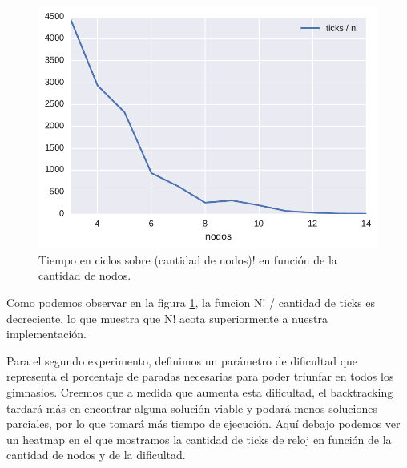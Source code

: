 \begin{figure}[H]
  \begin{center}
    \includegraphics{../experimentacion/ej1/ej1_complejidad.pdf}
    \caption{Tiempo en ciclos sobre (cantidad de nodos)! en función de la cantidad de nodos.}
    \label{fig:ej1_complejidad}
  \end{center}
\end{figure}

Como podemos observar en la figura \ref{fig:ej1_complejidad}, la funcion N! / cantidad de ticks es decreciente, lo que muestra que N! acota superiormente a nuestra implementación.

Para el segundo experimento, definimos un parámetro de dificultad que representa el porcentaje de paradas necesarias para poder triunfar en todos los gimnasios. Creemos que a medida que aumenta esta dificultad, el backtracking tardará más en encontrar alguna solución viable y podará menos soluciones parciales, por lo que tomará más tiempo de ejecución.
Aquí debajo podemos ver un heatmap en el que mostramos la cantidad de ticks de reloj en función de la cantidad de nodos y de la dificultad.

